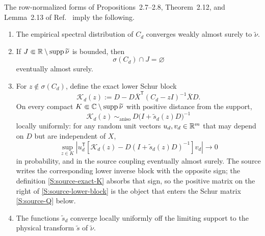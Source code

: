 \begin{proposition}
The row-normalized forms of Propositions~2.7--2.8,
Theorem~2.12, and Lemma~2.13 of Ref.~\cite{BenArousEtAl2025} imply the
following.
\begin{enumerate}
\item The empirical spectral distribution of $C_d$ converges weakly almost
surely to $\widetilde\nu$.
\item If $J\Subset\mathbb{R}\setminus\operatorname{supp}\widetilde\nu$ is bounded, then
\begin{equation}
\sigma(C_d)\cap J=\varnothing
\end{equation}
eventually almost surely.
\item For $z\notin\sigma(C_d)$, define the exact lower Schur block
\begin{equation}
\mathcal K_d(z)
:=D-D\overline X^{\mathsf T}(C_d-zI)^{-1}\overline X D.
\label{S:source-exact-K}
\end{equation}
On every compact $K\Subset\mathbb{C}\setminus\operatorname{supp}\widetilde\nu$ with positive
distance from the support,
\begin{equation}
\mathcal K_d(z)
\ \sim_{\mathrm{aniso}}\
D\bigl(I+\widetilde s_d(z)D\bigr)^{-1}
\label{S:source-lower-block}
\end{equation}
locally uniformly: for any random unit vectors $u_d,v_d\in\mathbb{R}^m$ that may
depend on $D$ but are independent of $X$,
\begin{equation}
\sup_{z\in K}
\left|
 u_d^{\mathsf T}
 \left[\mathcal K_d(z)-D(I+\widetilde s_d(z)D)^{-1}\right]
 v_d
\right|\longrightarrow0
\end{equation}
in probability, and in the source coupling eventually almost surely.
The source writes the corresponding lower inverse block with the opposite
sign; the definition \eqref{S:source-exact-K} absorbs that sign, so the
positive matrix on the right of \eqref{S:source-lower-block} is the object
that enters the Schur matrix \eqref{S:source-Q} below.
\item The functions $\widetilde s_d$ converge locally uniformly off the
limiting support to the physical transform $\widetilde s$ of
$\widetilde\nu$.
\end{enumerate}
\end{proposition}

